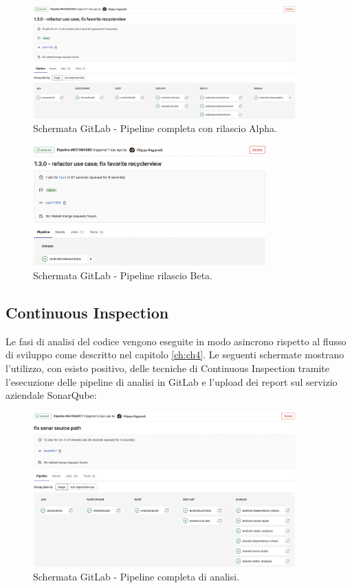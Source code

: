\begin{figure}[H]
\centering
    \includegraphics[width=0.9\textwidth]{img/Screenshot 2022-09-28 at 15.51.47.png}
    \caption{Schermata GitLab - Pipeline completa con rilascio Alpha.}
    \label{alpharelease}
\end{figure}

\begin{figure}[H]
\centering
    \includegraphics[width=0.8\textwidth]{img/Screenshot 2022-09-28 at 16.11.22.png}
    \caption{Schermata GitLab - Pipeline rilascio Beta.}
    \label{betarelease}
\end{figure}

\subsection{Continuous Inspection}
Le fasi di analisi del codice vengono eseguite in modo asincrono rispetto al flusso di sviluppo come descritto nel capitolo \ref{ch:ch4}. Le seguenti schermate mostrano l'utilizzo, con esisto positivo, delle tecniche di Continuous Inspection tramite l'esecuzione delle pipeline di analisi in GitLab e l'upload dei report sul servizio aziendale SonarQube:
\begin{figure}[H]
\centering
    \includegraphics[width=0.9\textwidth]{img/Screenshot 2022-09-28 at 16.15.34.png}
    \caption{Schermata GitLab - Pipeline completa di analisi.}
    \label{fullpipeline}
\end{figure}

